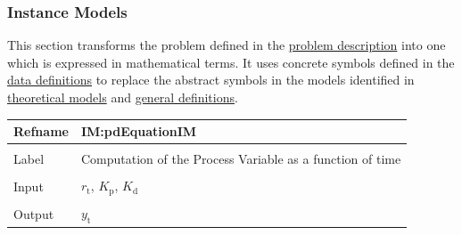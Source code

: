 \documentclass[12pt]{article}
\begin{document}
\subsubsection{Instance Models}
\label{Sec:IMs}
This section transforms the problem defined in the \hyperref[Sec:ProbDesc]{problem description} into one which is expressed in mathematical terms. It uses concrete symbols defined in the \hyperref[Sec:DDs]{data definitions} to replace the abstract symbols in the models identified in \hyperref[Sec:TMs]{theoretical models} and \hyperref[Sec:GDs]{general definitions}.

\vspace{\baselineskip}
\noindent
\begin{minipage}{\textwidth}
\begin{tabular}{>{\raggedright}p{}>{\raggedright\arraybackslash}p{}}
\toprule \textbf{Refname} & \textbf{IM:pdEquationIM}
\label{IM:pdEquationIM}
\\ \midrule \\
Label & Computation of the Process Variable as a function of time
        
\\ \midrule \\
Input & ${r_{\text{t}}}$, ${K_{\text{p}}}$, ${K_{\text{d}}}$
        
\\ \midrule \\
Output & ${y_{\text{t}}}$
         

\end{tabular}
\end{minipage}
\end{document}
